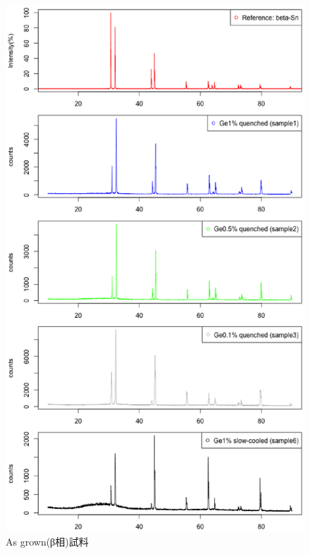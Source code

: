 \begin{figure}[htb]
    \begin{center}
   \includegraphics[width=150mm]{results_discussions/intensity_asgrown_samples.eps}
  \end{center}
  \caption{As grown(β相)試料}
  \label{fig:intensity_pested_samples}
\end{figure}

